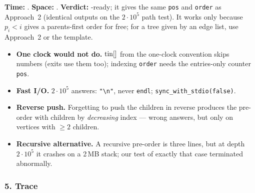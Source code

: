 \begin{alternativebox}
\begin{complexitybox}
\textbf{Time:} . \textbf{Space:} . \textbf{Verdict:} \ac{}-ready; it gives the same \texttt{pos} and \texttt{order} as Approach~2 (identical outputs on the $2\cdot10^5$ path test). It works only because $p_i < i$ gives a parents-first order for free; for a tree given by an edge list, use Approach~2 or the template.
\end{complexitybox}
\end{alternativebox}

\begin{tricksbox}
\begin{itemize}[leftmargin=*]
    \item \textbf{One clock would not do.} $\mathrm{tin}[]$ from the one-clock convention skips numbers (exits use them too); indexing \texttt{order} needs the entries-only counter \texttt{pos}.
    \item \textbf{Fast I/O.} $2\cdot10^5$ answers: \texttt{"\textbackslash n"}, never \texttt{endl}; \texttt{sync\_with\_stdio(false)}.
    \item \textbf{Reverse push.} Forgetting to push the children in reverse produces the pre-order with children by \emph{decreasing} index --- wrong answers, but only on vertices with $\ge 2$ children.
    \item \textbf{Recursive alternative.} A recursive pre-order is three lines, but at depth $2\cdot10^5$ it crashes on a 2\,MB stack; our test of exactly that case terminated abnormally.
\end{itemize}
\end{tricksbox}

\subsubsection*{5. Trace}

